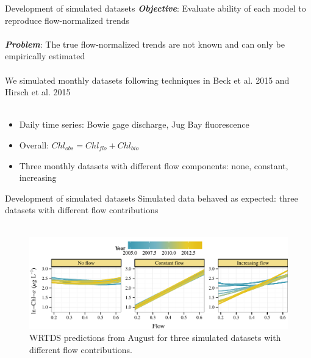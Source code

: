 \documentclass[serif]{beamer}\usepackage[]{graphicx}\usepackage[]{color}
\makeatletter
\def\maxwidth{ %
  \ifdim\Gin@nat@width>\linewidth
    \linewidth
  \else
    \Gin@nat@width
  \fi
}
\newenvironment{knitrout}{}{} %
\newcommand{\Bigtxt}[1]{\textbf{\textit{#1}}}
\makeatother
\begin{document}
\begin{frame}{Development of simulated datasets}
\Bigtxt{Objective}: Evaluate ability of each model to reproduce flow-normalized trends\\~\\
\Bigtxt{Problem}: The true flow-normalized trends are not known and can only be empirically estimated \\~\\
We simulated monthly datasets following techniques in Beck et al. 2015 and Hirsch et al. 2015 \\~\\
\begin{itemize}
\item Daily time series: Bowie gage discharge, Jug Bay fluorescence
\item Overall: $Chl_{obs} = Chl_{flo} + Chl_{bio}$
\item Three monthly datasets with different flow components: none, constant, increasing
\end{itemize}
\end{frame}

\begin{frame}{Development of simulated datasets}
Simulated data behaved as expected: three datasets with different flow contributions \\~\\
\begin{knitrout}
\color{fgcolor}\begin{figure}[!ht]

{\centering \includegraphics[width=\maxwidth]{figs/unnamed-chunk-8-1} 

}

\caption[WRTDS predictions from August for three simulated datasets with different flow contributions]{WRTDS predictions from August for three simulated datasets with different flow contributions.}\label{fig:unnamed-chunk-8}
\end{figure}


\end{knitrout}
\end{frame}
\end{document}
